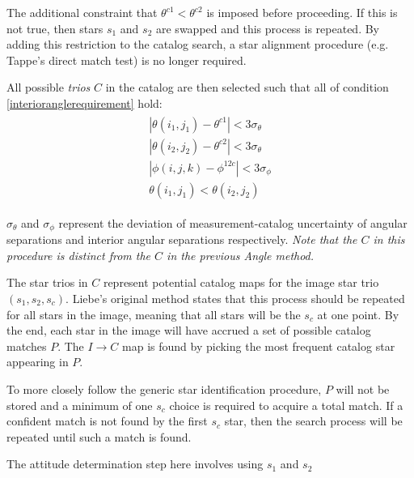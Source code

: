 The additional constraint that $\theta^{c1} < \theta^{c2}$ is imposed before proceeding. If this is not true, then stars $s_1$ and $s_2$ are swapped and this process is repeated. By adding this restriction to the catalog search, a star alignment procedure (e.g. Tappe's direct match test) is no longer required. 

All possible \textit{trios} $C$ in the catalog are then selected such that all of condition \eqref{interioranglerequirement} hold:
\begin{align} \label{interioranglerequirement}
\begin{split}
|\theta(i_1, j_1) - \theta^{c1}| < 3 \sigma_{\theta}
\\
|\theta(i_2, j_2) - \theta^{c2}| < 3 \sigma_{\theta}
\\
|\phi(i, j, k) - \phi^{12c}| < 3 \sigma_{\phi}
\\
\theta(i_1, j_1) < \theta(i_2, j_2)
\end{split}
\end{align}

$\sigma_{\theta}$ and $\sigma_{\phi}$ represent the deviation of measurement-catalog uncertainty of angular separations and interior angular separations respectively. \textit{Note that the $C$ in this procedure is distinct from the $C$ in the previous Angle method.}

The star trios in $C$ represent potential catalog maps for the image star trio $(s_1, s_2, s_c)$. Liebe's original method states that this process should be repeated for all stars in the image, meaning that all stars will be the $s_c$ at one point. By the end, each star in the image will have accrued a set of possible catalog matches $P$. The $I \rightarrow C$ map is found by picking the most frequent catalog star appearing in $P$. 

To more closely follow the generic star identification procedure, $P$ will not be stored and a minimum of one $s_c$ choice is required to acquire a total match. If a confident match is not found by the first $s_c$ star, then the search process will be repeated until such a match is found. 

The attitude determination step here involves using $s_1$ and $s_2$ 


